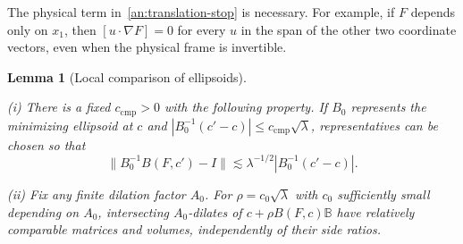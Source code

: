 \documentclass[11pt]{amsart}
\newtheorem{lemma}[theorem]{Lemma}
\theoremstyle{definition}
\theoremstyle{remark}
\numberwithin{equation}{section}
\begin{document}
The physical term in~\eqref{an:translation-stop} is necessary. For example, if $F$ depends only on $x_1$, then $[u\cdot\nabla F]=0$ for every $u$ in the span of the other two coordinate vectors, even when the physical frame is invertible.

\begin{lemma}[Local comparison of ellipsoids]\label{an:comparison}

\leavevmode\noindent\textup{(i)} There is a fixed $c_{\mathrm{cmp}}>0$ with the following property. If $B_0$ represents the minimizing ellipsoid at $c$ and $|B_0^{-1}(c'-c)|\le c_{\mathrm{cmp}}\sqrt\lambda$, representatives can be chosen so that
\begin{equation}\label{an:relative-comparison}
\|B_0^{-1}B(F,c')-I\|\lesssim \lambda^{-1/2}|B_0^{-1}(c'-c)|.
\end{equation}

\noindent\textup{(ii)} Fix any finite dilation factor $A_0$. For $\rho=c_0\sqrt\lambda$ with $c_0$ sufficiently small depending on $A_0$, intersecting $A_0$-dilates of $c+\rho B(F,c)\mathbb B$ have relatively comparable matrices and volumes, independently of their side ratios.
\end{lemma}
\end{document}
